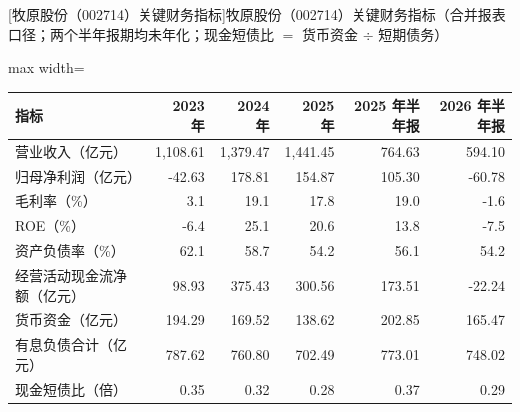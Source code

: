 \begin{center}\small\setlength{\tabcolsep}{3.4pt}
[牧原股份（002714）关键财务指标]{牧原股份（002714）关键财务指标（合并报表口径；两个半年报期均未年化；现金短债比 $=$ 货币资金 $\div$ 短期债务）}
\begin{adjustbox}{max width=\textwidth}
\begin{tabular}{@{}lrrrrr@{}}
\toprule
指标 & 2023 年 & 2024 年 & 2025 年 & 2025 年半年报 & 2026 年半年报 \\
\midrule
营业收入（亿元） & 1,108.61 & 1,379.47 & 1,441.45 & 764.63 & 594.10 \\
归母净利润（亿元） & -42.63 & 178.81 & 154.87 & 105.30 & -60.78 \\
毛利率（\%） & 3.1 & 19.1 & 17.8 & 19.0 & -1.6 \\
ROE（\%） & -6.4 & 25.1 & 20.6 & 13.8 & -7.5 \\
资产负债率（\%） & 62.1 & 58.7 & 54.2 & 56.1 & 54.2 \\
经营活动现金流净额（亿元） & 98.93 & 375.43 & 300.56 & 173.51 & -22.24 \\
货币资金（亿元） & 194.29 & 169.52 & 138.62 & 202.85 & 165.47 \\
有息负债合计（亿元） & 787.62 & 760.80 & 702.49 & 773.01 & 748.02 \\
现金短债比（倍） & 0.35 & 0.32 & 0.28 & 0.37 & 0.29 \\
\bottomrule
\end{tabular}
\end{adjustbox}
\end{center}

